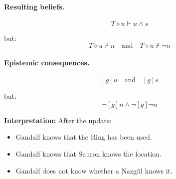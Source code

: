 \documentclass[11pt]{article}
\begin{document}
    \paragraph{Resulting beliefs.}

    \[
    T \diamond u \vdash u \wedge s
    \]

    but:
    \[
    T \diamond u \nvdash n \quad \text{and} \quad T \diamond u \nvdash \neg n
    \]

    \paragraph{Epistemic consequences.}

    \[
    [g]u \quad \text{and} \quad [g]s
    \]

    but:
    \[
    \neg [g]n \wedge \neg [g]\neg n
    \]

    \textbf{Interpretation:}
    After the update:
    \begin{itemize}
        \item Gandalf knows that the Ring has been used.
        \item Gandalf knows that Sauron knows the location.
        \item Gandalf does not know whether a Nazg\^ul knows it.
    \end{itemize}
\end{document}
